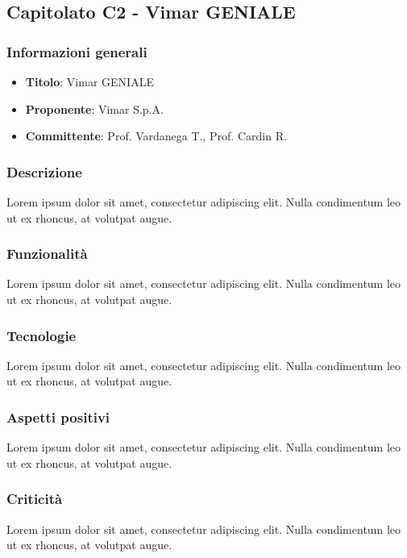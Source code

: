 \subsection{Capitolato C2 - Vimar GENIALE}
     \subsubsection{Informazioni generali}
        \begin{itemize}
            \item \textbf{Titolo}: Vimar GENIALE
            \item \textbf{Proponente}: Vimar S.p.A.
            \item \textbf{Committente}: Prof. Vardanega T., Prof. Cardin R.
        \end{itemize}
     \subsubsection{Descrizione}
    Lorem ipsum dolor sit amet, consectetur adipiscing elit. Nulla condimentum leo ut ex rhoncus, at volutpat augue.
     \subsubsection{Funzionalità}
    Lorem ipsum dolor sit amet, consectetur adipiscing elit. Nulla condimentum leo ut ex rhoncus, at volutpat augue.
    \subsubsection{Tecnologie}
    Lorem ipsum dolor sit amet, consectetur adipiscing elit. Nulla condimentum leo ut ex rhoncus, at volutpat augue.
    \subsubsection{Aspetti positivi}
    Lorem ipsum dolor sit amet, consectetur adipiscing elit. Nulla condimentum leo ut ex rhoncus, at volutpat augue.
    \subsubsection{Criticità}
    Lorem ipsum dolor sit amet, consectetur adipiscing elit. Nulla condimentum leo ut ex rhoncus, at volutpat augue.